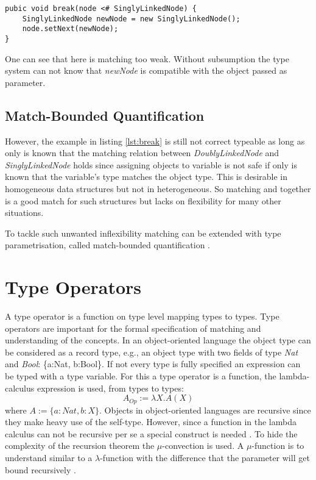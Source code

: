 \begin{lstlisting}[label={lst:matchbreak},caption={Matching relation in the break method}]
pubic void break(node <# SinglyLinkedNode) {
	SinglyLinkedNode newNode = new SinglyLinkedNode();
	node.setNext(newNode);
}
\end{lstlisting}

One can see that here is matching too weak. Without subsumption the type system
can not know that \emph{newNode} is compatible with the object passed as parameter.

\subsection{Match-Bounded Quantification}
However, the example in listing \ref{lst:break} is still not correct
typeable as long as only is known that the matching relation between
\emph{DoublyLinkedNode} and \emph{SinglyLinkedNode} holds since assigning
objects to variable is not safe if only is known that the variable's type
matches the object type. This is desirable in homogeneous data structures
but not in heterogeneous. So matching and \mytype together is a good match
for such structures but lacks on flexibility for many other situations.

To tackle such unwanted inflexibility matching can be extended
with type parametrisation, called match-bounded quantification
\cite{abadi_subtyping_1996}. 

\section{Type Operators}
A type operator is a function on type level mapping types to types. Type
operators are important for the formal specification of matching and
understanding of the concepts. In an object-oriented language the object
type can be considered as a record type, e.g., an object type with two
fields of type \emph{Nat} and \emph{Bool}: \{a:Nat, b:Bool\}. If not
every type is fully specified an expression can be typed with a type
variable. For this a type operator is a function, the lambda-calculus
expression is used, from types to types: \[A_{Op} := \lambda X.A(X)
\] where $A := \{a:Nat, b:X\}$. Objects in object-oriented languages are
recursive since they make heavy use of the self-type. However, since a
function in the lambda calculus can not be recursive per se a special
construct is needed \cite{gabriel_why_1988}.  To hide the complexity of
the recursion theorem the $\mu$-convection is used. A $\mu$-function is
to understand similar to a $\lambda$-function with the difference that
the parameter will get bound recursively \cite{simons_theory_2002-3}.

